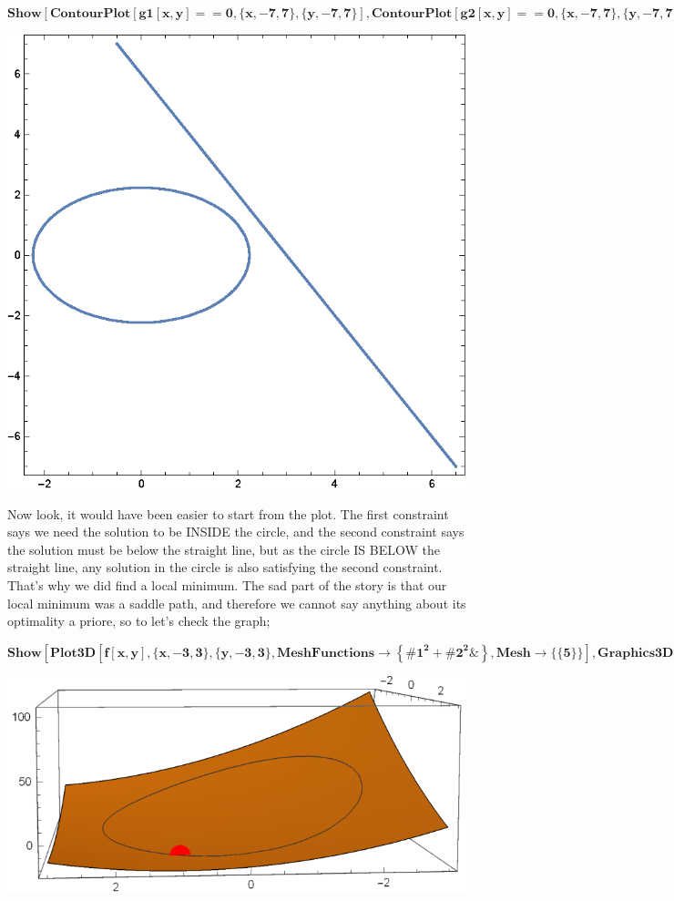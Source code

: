 \scriptsize
\begin{doublespace}
\noindent\(\pmb{\text{Show}[\text{ContourPlot}[\text{g1}[x,y]==0,\{x,-7,7\},\{y,-7,7\}],\text{ContourPlot}[\text{g2}[x,y]==0,\{x,-7,7\},\{y,-7,7\}],\text{PlotRange}\text{-$>$}\text{All},\text{AxesOrigin}\to
\{0,0\}]}\)
\end{doublespace}
\normalsize
\includegraphics{optimization_kuhn_tucker_gr1.eps}

Now look, it would have been easier to start from the plot. The first constraint says we need the solution to be INSIDE the circle, and the second
constraint says the solution must be below the straight line, but as the circle IS BELOW the straight line, any solution in the circle is also satisfying
the second constraint. That{'}s why we did find a local minimum. The sad part of the story is that our local minimum was a saddle path, and therefore
we cannot say anything about its optimality a priore, so to let{'}s check the graph;

\tiny
\begin{doublespace}
\noindent\(\pmb{\text{Show}\left[\text{Plot3D}\left[f[x,y],\{x,-3,3\},\{y,-3,3\},\text{MeshFunctions}\to \left\{\text{$\#$1}^2+\text{$\#$2}^2\&\right\},\text{Mesh}\to
\{\{5\}\}\right],\text{Graphics3D}[\{\text{Red},\text{PointSize}[0.05],\text{Point}[\text{Append}[\{1,2\},f[1,2]]]\}]\right]}\)
\end{doublespace}
\normalsize
\includegraphics{optimization_kuhn_tucker_gr2.eps}

